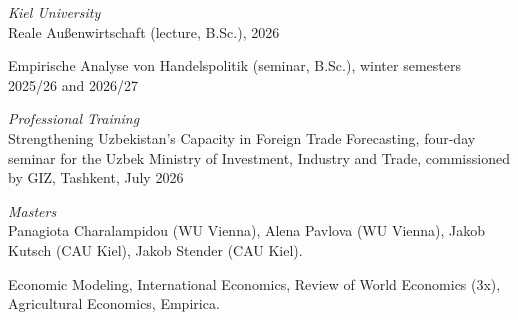 \documentclass{article}
\newlength{\cvlabelwidth}\setlength{\cvlabelwidth}{0.12\textwidth}
\newlength{\cvlabelgap}\setlength{\cvlabelgap}{5mm}
\newcommand{\cvmakelabel}[1]{%
    \smash{\parbox[t]{\cvlabelwidth}{\raggedright{\fontfamily{phv}\selectfont #1}}}}
\newenvironment{cvsection}[1]{%
    \par\medskip
    \begin{list}{}{%
        \setlength{\leftmargin}{\dimexpr\cvlabelwidth+\cvlabelgap\relax}%
        \setlength{\labelwidth}{\cvlabelwidth}%
        \setlength{\labelsep}{\cvlabelgap}%
        \setlength{\rightmargin}{0pt}%
        \setlength{\itemindent}{0pt}%
        \setlength{\listparindent}{0pt}%
        \setlength{\topsep}{0pt}%
        \setlength{\partopsep}{0pt}%
        \setlength{\parsep}{0.3em}%
        \setlength{\itemsep}{0pt}%
        \let\makelabel\cvmakelabel%
    }%
    \item[#1]\ignorespaces%
}{%
    \end{list}\medskip%
}
\begin{document}
\begin{cvsection}{TEACHING}
    \textit{Kiel University} \\
    Reale Außenwirtschaft (lecture, B.Sc.), 2026 \par
    Empirische Analyse von Handelspolitik (seminar, B.Sc.), winter semesters 2025/26 and 2026/27 \par
    \textit{Professional Training} \\
    Strengthening Uzbekistan's Capacity in Foreign Trade Forecasting, four-day seminar for the Uzbek Ministry of Investment, Industry and Trade, commissioned by GIZ, Tashkent, July 2026 \par
\end{cvsection}


\begin{cvsection}{MENTORED STUDENTS}
    \textit{Masters} \\
    Panagiota Charalampidou (WU Vienna), Alena Pavlova (WU Vienna), Jakob Kutsch (CAU Kiel), Jakob Stender (CAU Kiel).
\end{cvsection}


\begin{cvsection}{REFEREE SERVICE}
    Economic Modeling, International Economics, Review of World Economics (3x), Agricultural Economics, Empirica.
\end{cvsection}

\end{document}
